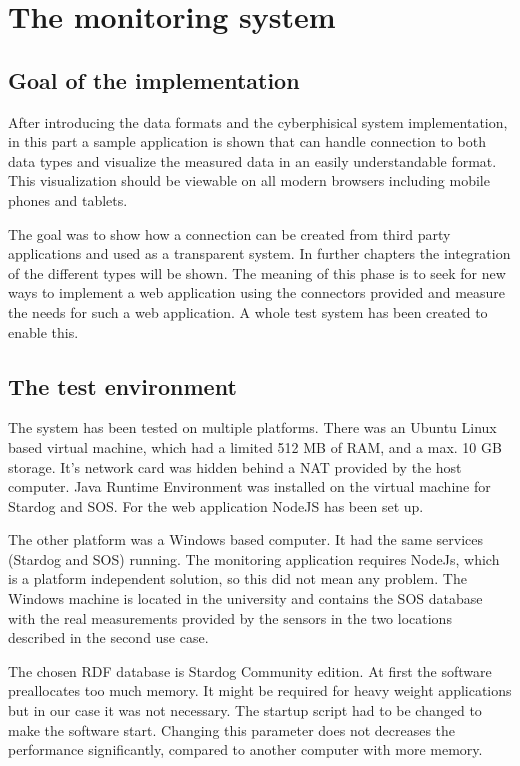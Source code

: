 \chapter{The monitoring system}
\section{Goal of the implementation}

After introducing the data formats and the cyberphisical system implementation, in this part a sample application is shown that can handle connection to both data types and visualize the measured data in an easily understandable format. This visualization should be viewable on all modern browsers including mobile phones and tablets.

The goal was to show how a connection can be created from third party applications and used as a transparent system. In further chapters the integration of the different types will be shown. The meaning of this phase is to seek for new ways to implement a web application using the connectors provided and measure the needs for such a web application. A whole test system has been created to enable this.

\section{The test environment}

The system has been tested on multiple platforms. There was an Ubuntu Linux based virtual machine, which had a limited 512 MB of RAM, and a max. 10 GB storage. It's network card was hidden behind a NAT provided by the host computer. Java Runtime Environment was installed on the virtual machine for Stardog and SOS. For the web application NodeJS has been set up. 

The other platform was a Windows based computer. It had the same services (Stardog and SOS) running. The monitoring application requires NodeJs, which is a platform independent solution, so this did not mean any problem. The Windows machine is located in the university and contains the SOS database with the real measurements provided by the sensors in the two locations described in the second use case. 

The chosen RDF database is Stardog Community edition. At first the software preallocates too much memory. It might be required for heavy weight applications but in our case it was not necessary.  The startup script had to be changed to make the software start. Changing this parameter does not decreases the performance significantly, compared to another computer with more memory. 

